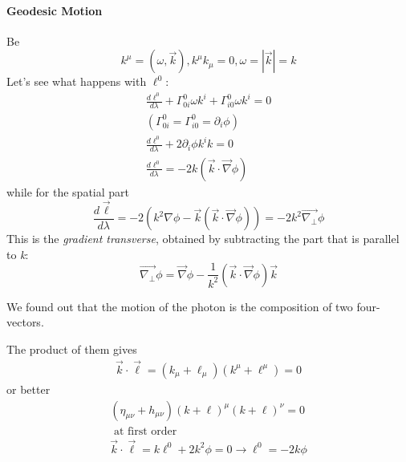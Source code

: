 \paragraph{Geodesic Motion}
Be
\[
k^{\mu } = \left( \omega ,\vec{k} \right), k^{\mu }k_{\mu }=0, \omega = |\vec{k}|=k
\]
Let's see what happens with $\ell^{0}$:
\begin{gather*}
\frac{d \ell^{0}}{d \lambda } + \Gamma ^{0}_{0i}\omega k^{i} + \Gamma ^{0}_{i0}\omega k^{i} = 0 \\
\left( \Gamma ^{0}_{0i} = \Gamma ^{0}_{i0} = \partial_{i}\phi  \right) \\
\frac{d \ell^{0}}{d \lambda } + 2\partial_{i}\phi k^{i}k = 0 \\
\frac{d \ell^{0}}{d \lambda } = -2k\left( \vec{k}\cdot \vec{\nabla }\phi  \right)
\end{gather*}
while for the spatial part
\begin{equation}
	\frac{d \vec{\ell}}{d \lambda } = -2\left( k^{2}\nabla \phi - \vec{k}\left( \vec{k}\cdot \vec{\nabla }\phi  \right) \right) = -2k^{2}\vec{\nabla _{\bot}}\phi 
\end{equation}
This is the \emph{gradient transverse}, obtained by subtracting the part that is parallel to \emph{k}:
\begin{equation}
	\vec{\nabla _{\bot}}\phi   = \vec{\nabla }\phi - \frac{1}{k^{2}}\left( \vec{k}\cdot \vec{\nabla }\phi  \right)\vec{k}
\end{equation}

We found out that the motion of the photon is the composition of two four-vectors. \par
The product of them gives
\begin{gather*}
	\vec{k}\cdot\vec{\ell}  = \left( k_{\mu }+ \ell_{\mu }\right)\left( k^{\mu }+\ell^{\mu } \right) = 0
\end{gather*}
or better
\begin{gather*}
	\left( \eta _{\mu \nu }+h_{\mu \nu } \right)\left( k + \ell \right)^{\mu }\left( k + \ell \right)^{\nu } = 0 \\
	\text{ at first order }\\
	\vec{k}\cdot \vec{\ell} = k\ell^{0}+2k^{2}\phi = 0 \to  \ell^{0} = -2k\phi 
\end{gather*}

